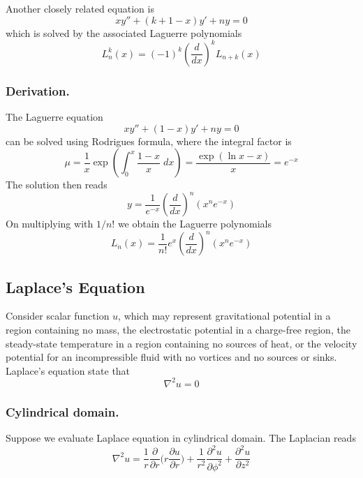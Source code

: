 \documentclass[../main.tex]{subfiles}
\begin{document}
Another closely related equation is 
\begin{equation*}
    xy''+(k+1-x)y'+ny=0
\end{equation*}
which is solved by the associated Laguerre polynomials
\begin{equation*}
    L_n^k(x)=(-1)^k\left(\frac{d}{dx}\right)^kL_{n+k}(x)
\end{equation*}

\subsubsection*{Derivation.} 
The Laguerre equation
\begin{equation*}
    xy''+(1-x)y'+ny=0
\end{equation*}
can be solved using Rodrigues formula, where the integral factor is 
\begin{equation*}
    \mu=\frac{1}{x}\exp\left(\int_{0}^{x}\frac{1-x}{x}\;dx\right)=\frac{\exp(\ln x-x )}{x}=e^{-x}
\end{equation*}
The solution then reads
\begin{equation*}
    y=\frac{1}{e^{-x}}\left(\frac{d}{dx}\right)^n\left(x^ne^{-x}\right)
\end{equation*}
On multiplying with $1/n!$ we obtain the Laguerre polynomials
\begin{equation*}
    L_n(x)=\frac{1}{n!}e^x\left(\frac{d}{dx}\right)^n(x^ne^{-x})
\end{equation*}

\subsection*{Laplace's Equation}
Consider scalar function $u$, which may represent gravitational potential in a region containing no mass, the electrostatic potential in a charge-free region, the steady-state temperature in a region containing no sources of heat, or the velocity potential for an incompressible fluid with no vortices and no sources or sinks.
Laplace's equation state that
\begin{equation*}
    \nabla^2 u=0
\end{equation*}

\subsubsection*{Cylindrical domain.} Suppose we evaluate Laplace equation in cylindrical domain. 
The Laplacian reads
\begin{equation*}
    \nabla^2u= \frac{1}{r}\frac{\partial}{\partial r}\Biggl(r\frac{\partial u}{\partial r}\Biggr)+\frac{1}{r^2} \frac{\partial^2u}{\partial \phi^2}+ \frac{\partial^2u}{\partial z^2}
\end{equation*}
\end{document}
